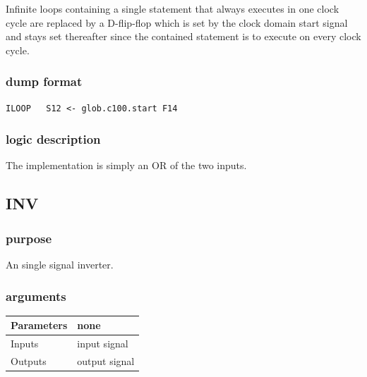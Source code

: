 \documentclass[10pt,a4paper,twoside,fleqn]{book}
\begin{document}
                    Infinite loops containing a single statement that always
                    executes in one clock cycle are replaced by a D-flip-flop which
                    is set by the clock domain start signal and stays set thereafter
                    since the contained statement is to execute on every clock
                    cycle.

                \subsubsection{dump format}

                    \begin{lstlisting}[gobble=20, language=tde]
                        ILOOP   S12 <- glob.c100.start F14
                    \end{lstlisting}

                \subsubsection{logic description}

                    The implementation is simply an OR of the two inputs.


            \subsection{INV}

                \subsubsection{purpose}

                    An single signal inverter.

                \subsubsection{arguments}

                    \begin{tabular}{| l | l |}
                    \hline
                    Parameters  & none \\
                    \hline
                    Inputs      & input signal \\
                    \hline
                    Outputs     & output signal \\
                    \hline
                    \end{tabular}
\end{document}
